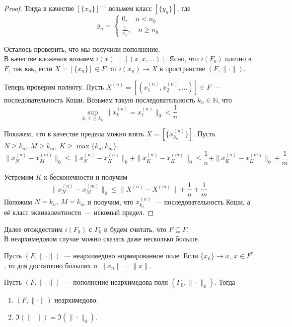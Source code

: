 \documentclass[11pt]{report}
\begin{document}
\begin{proof}
        Тогда в качестве $[\{ x_n \}]^{-1}$ возьмем класс $[\{ y_n \}]$, где
        \[ y_n = \begin{cases} 0,\quad n < n_0 \\ \frac{1}{x_n}, \quad n \ge n_0 \end{cases}\]

        Осталось проверить, что мы получили пополнение. \\
        В качестве вложения возьмем $i(x) = [(x, x, \ldots)]$. Ясно, что $i(F_0)$ плотно в $F$, так как, если
        $X = [\{ x_n \}] \in F$, то $i(x_n) \to X$ в пространстве $(F, \| \cdot \| )$.

        Теперь проверим полноту. Пусть $X^{(n)} = [( x_1^{(n)}, x_2^{(n)}, \ldots ) ] \in F$~--- последовательность Коши.
        Возьмем такую последовательность $k_n \in \mathbb{N}$, что
        \[ \sup\limits_{k, \ell \ge k_n} \| x_k^{(n)} = x_{\ell}^{(n)}\|_0 < \frac{1}{n} \]

        Покажем, что в качестве предела можно взять $X = [ \{ x_{k_n}^{(n)} \}]$. Пусть $N \ge k_n, \ M \ge k_m, \ K \ge \max\{ k_n, k_m \}$.
        \[ \| x_N^{(n)} - x_M^{(m)}\|_0 \le \| x_N^{(n)} - x_K^{(n)}\|_0 + \| x_K^{(n)} - x_K^{(m)}\|_0 \le \frac{1}{n} + \| x_K^{(n)} - x_K^{(m)}\|_0 + \frac{1}{m} \]

        Устремим $K$ к бесконечности и получим
        \[ \| x_N^{(n)} - x_M^{(m)} \|_0 \le \| X^{(n)} - X^{(m)}\| + \frac{1}{n} + \frac{1}{m} \]
        Положим $N = k_{n}, \ M = k_m$ и получим, что $x_{k_n}^{(n)}$~--- последовательность Коши, а её класс эквивалентности~--- искомый предел.
    \end{proof}

    Далее отождествим $i(F_0)$ с $F_0$ и будем считать, что $F \subseteq F$.\\

    В неархимедовом случае можно сказать даже несколько больше.

   Пусть $(F, \| \cdot \|)$~--- неархимедово нормированное поле. Если  $\{ x_n \} \to x, \ x \in F^{*}$, то для достаточно больших
    $n$ $\| x_n \| = \| x \|$.

   \begin{lemma}
       Пусть $(F, \| \cdot \|)$~--- пополнение неархимедова поля $(F_0, \| \cdot \|_0)$. Тогда
       \begin{enumerate}
           \item $(F, \| \cdot \|)$ неархимедово.

           \item $\Im(\| \cdot \|) = \Im(\| \cdot \|_0)$.
       \end{enumerate}
   \end{lemma}
\end{document}
